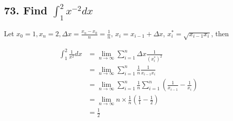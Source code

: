 \documentclass{article}
\begin{document}
    \subsection*{73. Find $\int_1^2 x^{-2}dx$}

    Let $x_0 = 1, x_n = 2, \Delta x = \frac{x_n - x_0}{n} = \frac 1 n$, $x_i = x_{i - 1} + \Delta x$, $x_i^* = \sqrt{x_{i - 1}x_i}$, then 

    $$\begin{aligned}
        \int_1^2\frac{1}{x^2} dx &= \lim_{n \to \infty} \sum_{i = 1}^n \Delta x \frac{1}{(x_i^*)^2}  \\
        &= \lim_{n \to \infty} \sum_{i = 1}^n \frac 1 n \frac{1}{x_{i - 1}{x_i}}  \\
        &= \lim_{n \to \infty} \sum_{i = 1}^n \frac 1 n \sum_{i = 1}^n (\frac{1}{x_{i - 1}} - \frac{1}{x_i}) \\
        &= \lim_{n \to \infty} n \times \frac 1 n (\frac 1 1 - \frac 1 2) \\
        &= \frac 1 2
    \end{aligned}$$

\end{document}
